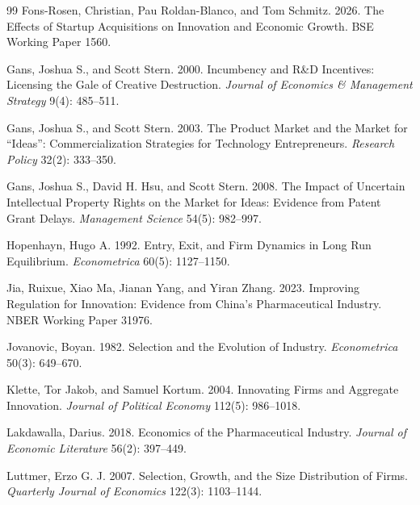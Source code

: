 \documentclass[12pt]{article}
\newcommand{\1}{\mathbf{1}}
\begin{document}
\begin{thebibliography}{99}
Fons-Rosen, Christian, Pau Roldan-Blanco, and Tom Schmitz. 2026.
\newblock The Effects of Startup Acquisitions on Innovation and Economic Growth.
\newblock BSE Working Paper 1560.

Gans, Joshua S., and Scott Stern. 2000.
\newblock Incumbency and R\&D Incentives: Licensing the Gale of Creative Destruction.
\newblock \emph{Journal of Economics \& Management Strategy} 9(4): 485--511.

Gans, Joshua S., and Scott Stern. 2003.
\newblock The Product Market and the Market for ``Ideas'': Commercialization Strategies for Technology Entrepreneurs.
\newblock \emph{Research Policy} 32(2): 333--350.

Gans, Joshua S., David H. Hsu, and Scott Stern. 2008.
\newblock The Impact of Uncertain Intellectual Property Rights on the Market for Ideas: Evidence from Patent Grant Delays.
\newblock \emph{Management Science} 54(5): 982--997.

Hopenhayn, Hugo A. 1992.
\newblock Entry, Exit, and Firm Dynamics in Long Run Equilibrium.
\newblock \emph{Econometrica} 60(5): 1127--1150.

Jia, Ruixue, Xiao Ma, Jianan Yang, and Yiran Zhang. 2023.
\newblock Improving Regulation for Innovation: Evidence from China's Pharmaceutical Industry.
\newblock NBER Working Paper 31976.

Jovanovic, Boyan. 1982.
\newblock Selection and the Evolution of Industry.
\newblock \emph{Econometrica} 50(3): 649--670.

Klette, Tor Jakob, and Samuel Kortum. 2004.
\newblock Innovating Firms and Aggregate Innovation.
\newblock \emph{Journal of Political Economy} 112(5): 986--1018.

Lakdawalla, Darius. 2018.
\newblock Economics of the Pharmaceutical Industry.
\newblock \emph{Journal of Economic Literature} 56(2): 397--449.

Luttmer, Erzo G. J. 2007.
\newblock Selection, Growth, and the Size Distribution of Firms.
\newblock \emph{Quarterly Journal of Economics} 122(3): 1103--1144.

\end{thebibliography}
\end{document}
